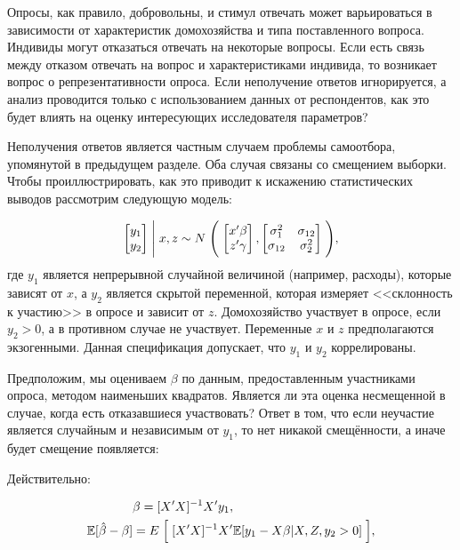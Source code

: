 Опросы, как правило, добровольны, и стимул отвечать может варьироваться в зависимости от  характеристик домохозяйства и типа поставленного вопроса. Индивиды могут отказаться отвечать на некоторые вопросы. Если есть связь между  отказом отвечать на вопрос и характеристиками индивида, то возникает вопрос о репрезентативности опроса. Если неполучение ответов игнорируется, а  анализ проводится только с использованием данных от респондентов, как это будет влиять на оценку интересующих исследователя параметров?


Неполучения ответов является частным случаем проблемы самоотбора, упомянутой в предыдущем разделе. Оба случая связаны со смещением выборки. Чтобы проиллюстрировать, как это приводит к искажению статистических выводов рассмотрим следующую модель:

\begin{equation}
\begin{bmatrix} y_{1} \\ y_{2} \end{bmatrix} \Biggm| x,z \sim N \Biggm( \begin{bmatrix} x'\beta \\ z'\gamma \end{bmatrix}, \begin{bmatrix} \sigma^2_{1} & \sigma_{12} \\ \sigma_{12} &  \sigma^2_{2}\end{bmatrix}\Biggm),
\end{equation}
где $y_{1}$ является непрерывной случайной величиной (например, расходы), которые зависят от $x$, а $y_{2}$ является скрытой переменной, которая измеряет <<склонность к участию>> в опросе и зависит от $z$. Домохозяйство участвует в опросе, если $y_{2}>0$, а в противном случае не участвует. Переменные $x$ и $z$ предполагаются экзогенными. Данная спецификация допускает, что $y_{1}$ и $y_{2}$  коррелированы. 


Предположим, мы оцениваем $\beta$ по данным, предоставленным участниками опроса, методом наименьших квадратов. Является ли эта оценка несмещенной в случае, когда есть отказавшиеся участвовать? Ответ в том, что если неучастие является случайным и независимым от $y_{1}$, то нет никакой смещённости, а иначе будет смещение появляется:

Действительно:

\[
\begin{aligned}
&{\beta}=[X'X]^{-1}X'y_{1}, \\
\mathbb{E}[\hat{\beta}-\beta]&=E\Bigm[ [X'X]^{-1}X'\mathbb{E}[y_{1}-X\beta|X,Z,y_{2}>0] \Bigm],
\end{aligned}
\]

